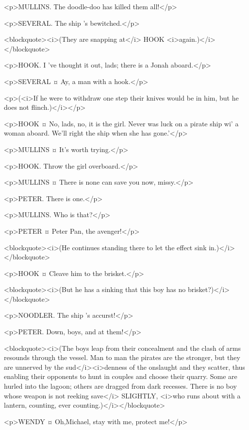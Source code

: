 <p>MULLINS. The doodle-doo has killed them all!</p>

<p>SEVERAL. The ship 's bewitched.</p>

<blockquote><i>(They are snapping at</i> HOOK <i>again.)</i></blockquote>

<p>HOOK. I 've thought it out, lads; there is a Jonah aboard.</p>

<p>SEVERAL ¤
Ay, a man with a hook.</p>

<p>(<i>If he were to withdraw one step their knives would be in him, but he does not flinch.)</i></p>

<p>HOOK ¤
No, lads, no, it is the girl. Never was luck on a pirate ship wi' a woman aboard. We'll right the ship when she has gone.'</p>

<p>MULLINS ¤
It's worth trying.</p>

<p>HOOK. Throw the girl overboard.</p>

<p>MULLINS ¤
There is none can save you now, missy.</p>

<p>PETER. There is one.</p>

<p>MULLINS. Who is that?</p>

<p>PETER ¤
Peter Pan, the avenger!</p>

<blockquote><i>(He continues standing there to let the effect sink in.)</i></blockquote>

<p>HOOK ¤
Cleave him to the brisket.</p>

<blockquote><i>(But he has a sinking that this boy has no brisket?)</i></blockquote>

<p>NOODLER. The ship 's accurst!</p>

<p>PETER. Down, boys, and at them!</p>

<blockquote><i>(The boys leap from their concealment and the clash of arms resounds through the vessel. Man to man the pirates are the stronger, but they are unnerved by the sud</i><i>denness of the onslaught and they scatter, thus enabling their opponents to hunt in couples and choose their quarry. Some are hurled into the lagoon; others are dragged from dark recesses. There is no boy whose weapon is not reeking save</i> SLIGHTLY, <i>who runs about with a lantern, counting, ever counting.)</i></blockquote>

<p>WENDY ¤
Oh,Michael, stay with me, protect me!</p>

